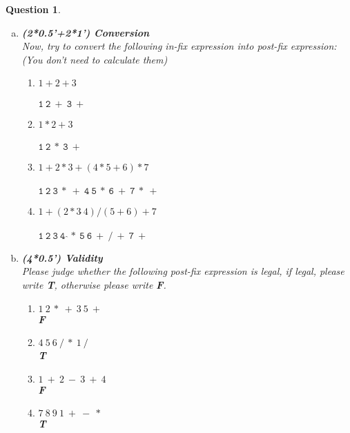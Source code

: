 \documentclass[10.5pt]{article}
\newtheorem{Q}{Question}
\begin{document}
\begin{Q}
\begin{enumerate}[(a)]
		\item \textbf{(2*0.5'+2*1') Conversion}\\
		Now, try to convert the following in-fix expression into post-fix expression: (You don't need to calculate them)\\
		\begin{enumerate}[1) ]
			\item $ 1+2+3 $\\
			\\
			$\mathtt{1 \ 2\  +\  3\ +}$\\
			\item $ 1*2+3 $\\
			\\
			$\mathtt{1\ 2\ * \ 3 \ +}$
			\\
			\item $ 1 + 2*3 + (4 * 5 + 6) * 7 $\\
			\\
			$\mathtt{1\ 2\ 3\ *\ +\ 4\ 5\ *\ 6\ +\ 7\ *\ +\ }$
			\\
			\item $ 1 + (2*3  \hat\   4) /(5+6)+7$\\
			\\
			$\mathtt{1\ 2\ 3\ 4\ \hat\ *\ 5\ 6\ +\ /\ +\ 7\ +}$
			\\
		\end{enumerate}
		\item \textbf{(4*0.5') Validity}\\
		Please judge whether the following post-fix expression is legal, if legal, please write \textbf{T}, otherwise please write \textbf{F}.
		\begin{enumerate}
			\item $ 1\ 2\ *\ +\ 3\ 5\ +\ $\\
			\textbf{F}
			\item $ 4\ 5\ 6\ /\ *\ 1\ /\ $\\
			\textbf{T}
			\item $ 1\ +\ 2\ -\ 3\ +\ 4\ $\\
			\textbf{F}
			\item $ 7\ 8\ 9\ 1\ +\ -\ *\ $\\
			\textbf{T}
		\end{enumerate}
	\end{enumerate}
	\end{Q}
	\pagebreak
\end{document}

